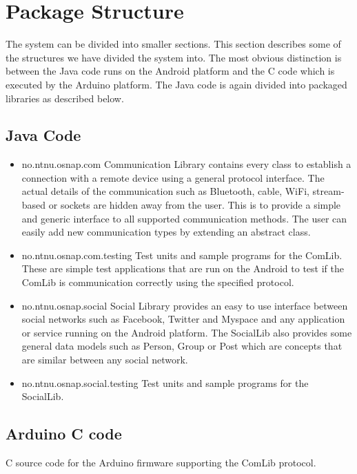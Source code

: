 \section{Package Structure}
The system can be divided into smaller sections. This section describes some of the structures
we have divided the system into. The most obvious distinction is between the Java code runs
on the Android platform and the C code which is executed by the Arduino platform.
The Java code is again divided into packaged libraries as described below.

\subsection{Java Code}
\begin{itemize}
\item{no.ntnu.osnap.com}\newline
Communication Library contains every class to establish a connection with a remote device using a general protocol interface. The actual details of the communication such as
Bluetooth, cable, WiFi, stream-based or sockets are hidden away from the user. This is to provide a simple and generic interface to all supported communication methods. The
user can easily add new communication types by extending an abstract class.
\item{no.ntnu.osnap.com.testing}\newline
Test units and sample programs for the ComLib. These are simple test applications that are run on the Android to test if the ComLib is communication correctly using the specified
protocol.
\item{no.ntnu.osnap.social}\newline
Social Library provides an easy to use interface between social networks such as Facebook, Twitter and Myspace and any application or service running on the Android platform.
The SocialLib also provides some general data models such as Person, Group or Post which are concepts that are similar between any social network. 
\item{no.ntnu.osnap.social.testing}  \newline
Test units and sample programs for the SocialLib.
\end{itemize}

\subsection{Arduino C code}
C source code for the Arduino firmware supporting the ComLib protocol.


